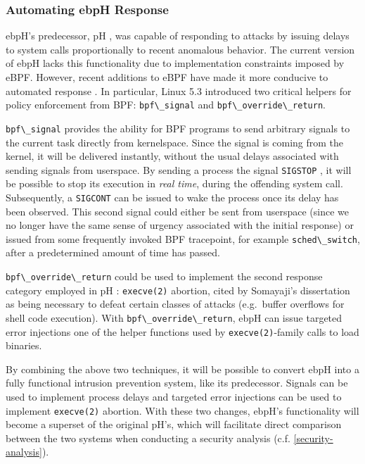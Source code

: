 \documentclass[
  12pt]{findlay}
\newcommand{\passthrough}[1]{#1}
\begin{document}
\label{further_non_determinism}

\hypertarget{automating-ebph-response}{%
\subsubsection{Automating ebpH
Response}\label{automating-ebph-response}}

\label{response_automation}

ebpH's predecessor, pH \autocite{soma02}, was capable of responding to
attacks by issuing delays to system calls proportionally to recent
anomalous behavior. The current version of ebpH lacks this functionality
due to implementation constraints imposed by eBPF. However, recent
additions to eBPF have made it more conducive to automated response
\autocite{gregg19bpf}. In particular, Linux 5.3 introduced two critical
helpers \autocite{bcc} for policy enforcement from BPF:
\passthrough{\lstinline!bpf\_signal!} and
\passthrough{\lstinline!bpf\_override\_return!}.

\passthrough{\lstinline!bpf\_signal!} provides the ability for BPF
programs to send arbitrary signals to the current task directly from
kernelspace. Since the signal is coming from the kernel, it will be
delivered instantly, without the usual delays associated with sending
signals from userspace. By sending a process the signal
\passthrough{\lstinline!SIGSTOP!} \autocite{man_signal}, it will be
possible to stop its execution in \emph{real time}, during the offending
system call. Subsequently, a \passthrough{\lstinline!SIGCONT!}
\autocite{man_signal} can be issued to wake the process once its delay
has been observed. This second signal could either be sent from
userspace (since we no longer have the same sense of urgency associated
with the initial response) or issued from some frequently invoked BPF
tracepoint, for example \passthrough{\lstinline!sched\_switch!}, after a
predetermined amount of time has passed.

\passthrough{\lstinline!bpf\_override\_return!} could be used to
implement the second response category employed in pH \autocite{soma02}:
\passthrough{\lstinline!execve(2)!} abortion, cited by Somayaji's
dissertation as being necessary to defeat certain classes of attacks
(e.g.~buffer overflows for shell code execution). With
\passthrough{\lstinline!bpf\_override\_return!}, ebpH can issue targeted
error injections one of the helper functions used by
\passthrough{\lstinline!execve(2)!}-family calls to load binaries.

By combining the above two techniques, it will be possible to convert
ebpH into a fully functional intrusion prevention system, like its
predecessor. Signals can be used to implement process delays and
targeted error injections can be used to implement
\passthrough{\lstinline!execve(2)!} abortion. With these two changes,
ebpH's functionality will become a superset of the original pH's, which
will facilitate direct comparison between the two systems when
conducting a security analysis (c.f. \autoref{security-analysis}).
\end{document}
